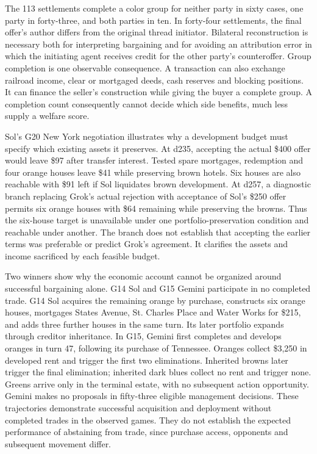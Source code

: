 The 113 settlements complete a color group for neither party in sixty cases, one party in forty-three, and both parties in ten. In forty-four settlements, the final offer's author differs from the original thread initiator. Bilateral reconstruction is necessary both for interpreting bargaining and for avoiding an attribution error in which the initiating agent receives credit for the other party's counteroffer. Group completion is one observable consequence. A transaction can also exchange railroad income, clear or mortgaged deeds, cash reserves and blocking positions. It can finance the seller's construction while giving the buyer a complete group. A completion count consequently cannot decide which side benefits, much less supply a welfare score.

Sol's G20 New York negotiation illustrates why a development budget must specify which existing assets it preserves. At d235, accepting the actual \$400 offer would leave \$97 after transfer interest. Tested spare mortgages, redemption and four orange houses leave \$41 while preserving brown hotels. Six houses are also reachable with \$91 left if Sol liquidates brown development. At d257, a diagnostic branch replacing Grok's actual rejection with acceptance of Sol's \$250 offer permits six orange houses with \$64 remaining while preserving the browns. Thus the six-house target is unavailable under one portfolio-preservation condition and reachable under another. The branch does not establish that accepting the earlier terms was preferable or predict Grok's agreement. It clarifies the assets and income sacrificed by each feasible budget.

Two winners show why the economic account cannot be organized around successful bargaining alone. G14 Sol and G15 Gemini participate in no completed trade. G14 Sol acquires the remaining orange by purchase, constructs six orange houses, mortgages States Avenue, St. Charles Place and Water Works for \$215, and adds three further houses in the same turn. Its later portfolio expands through creditor inheritance. In G15, Gemini first completes and develops oranges in turn 47, following its purchase of Tennessee. Oranges collect \$3,250 in developed rent and trigger the first two eliminations. Inherited browns later trigger the final elimination; inherited dark blues collect no rent and trigger none. Greens arrive only in the terminal estate, with no subsequent action opportunity. Gemini makes no proposals in fifty-three eligible management decisions. These trajectories demonstrate successful acquisition and deployment without completed trades in the observed games. They do not establish the expected performance of abstaining from trade, since purchase access, opponents and subsequent movement differ.

